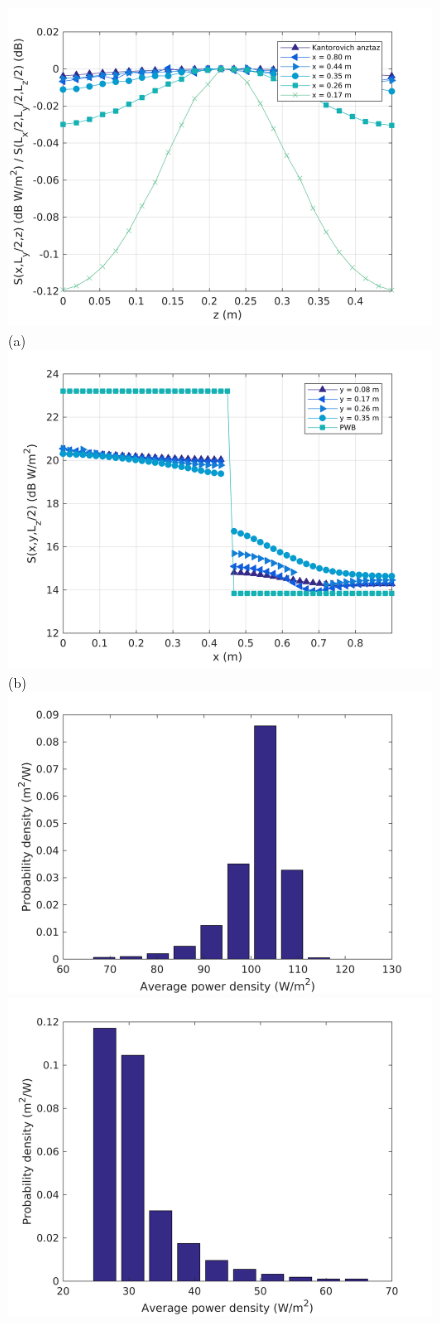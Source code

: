 \documentclass[a4paper]{article}
\numberwithin{equation}{section}
\begin{document}
\begin{figure}[ht]
\begin{center}
\includegraphics[width=0.6\linewidth]{figures/SDM_3D_DL_PowerDensityProfileZ}\\
{\footnotesize (a)}\\
\vspace{2mm}
\includegraphics[width=0.6\linewidth]{figures/SDM_3D_DL_PowerDensityProfileX}\\
{\footnotesize (b)}\\
\vspace{2mm}
\includegraphics[width=0.45\linewidth]{figures/SDM_3D_DL_PowerDensityPDF1}
\includegraphics[width=0.45\linewidth]{figures/SDM_3D_DL_PowerDensityPDF2}

\end{center}
\end{figure}
\end{document}
